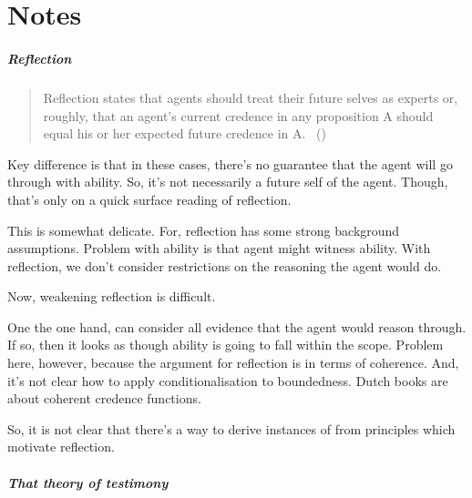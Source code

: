 \chapter{Notes}
\label{cha:notes}

\paragraph{Reflection}

\begin{note}[Reflection]
  \begin{quote}
    Reflection states that agents should treat their future selves as experts or, roughly, that an agent’s current credence in any proposition A should equal his or her expected future credence in A.%
    \mbox{ }\hfill\mbox{(\citeyear[59]{Briggs:2009up})}
  \end{quote}
\end{note}

\begin{note}
  Key difference is that in these cases, there's no guarantee that the agent will go through with ability.
  So, it's not necessarily a future self of the agent.
  Though, that's only on a quick surface reading of reflection.

  This is somewhat delicate.
  For, reflection has some strong background assumptions.
  Problem with ability is that agent might witness ability.
  With reflection, we don't consider restrictions on the reasoning the agent would do.

  Now, weakening reflection is difficult.

  One the one hand, can consider all evidence that the agent would reason through.
  If so, then it looks as though ability is going to fall within the scope.
  Problem here, however, because the argument for reflection is in terms of coherence.
  And, it's not clear how to apply conditionalisation to boundedness.
  Dutch books are about coherent credence functions.

  So, it is not clear that there's a way to derive instances of  from principles which motivate reflection.
\end{note}

\paragraph{That theory of testimony}

